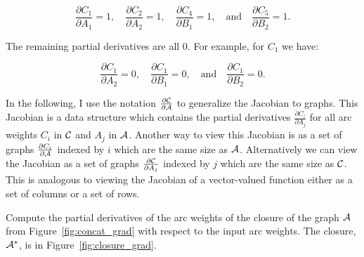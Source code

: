$$
\frac{\partial C_1}{\partial A_1} = 1,
    \quad \frac{\partial C_2}{\partial A_2} = 1,
    \quad \frac{\partial C_4}{\partial B_1} = 1,
    \quad\textrm{and}\quad \frac{\partial C_5}{\partial B_2} = 1.
$$

The remaining partial derivatives are all $0$. For example, for $C_1$ we have:

$$
\frac{\partial C_1}{\partial A_2} = 0,
    \quad \frac{\partial C_1}{\partial B_1} = 0,
    \quad \textrm{and} \quad \frac{\partial C_1}{\partial B_2} = 0.
$$

In the following, I use the notation $\frac{\partial \mathcal{C}}{\partial \mathcal{A}}$ to
generalize the Jacobian to graphs. This Jacobian is a data structure which
contains the partial derivatives $\frac{\partial C_i}{\partial A_j}$ for all
arc weights $C_i$ in $\mathcal{C}$ and $A_j$ in $\mathcal{A}$. Another way to view this
Jacobian is as a set of graphs $\frac{\partial C_i}{\partial \mathcal{A}}$ indexed by
$i$ which are the same size as $\mathcal{A}$. Alternatively we can view the Jacobian as
a set of graphs $\frac{\partial \mathcal{C}}{\partial A_j}$ indexed by $j$ which are
the same size as $\mathcal{C}$. This is analogous to viewing the Jacobian of a
vector-valued function either as a set of columns or a set of rows.

\begin{example}
Compute the partial derivatives of the arc weights of the closure of the graph
$\mathcal{A}$ from Figure~\ref{fig:concat_grad} with respect to the input arc
weights. The closure, $\mathcal{A}^*$, is in Figure~\ref{fig:closure_grad}.
\end{example}

